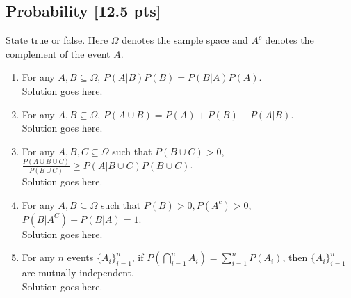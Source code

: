\documentclass[a4paper]{article}
\theoremstyle{definition}
\newenvironment{soln}{
    \leavevmode\color{blue}\ignorespaces
}{}
\begin{document}
\subsection{Probability [12.5 pts]}
State true or false. Here $\Omega$ denotes the sample space and $A^c$ denotes the complement of the event $A$.
\begin{enumerate}
\item For any $A, B \subseteq \Omega$, $P(A|B)P(B) = P(B|A)P(A)$.\\
  \begin{soln}  Solution goes here. \end{soln}
\item For any $A, B \subseteq \Omega$, $P(A \cup B) = P(A) + P(B) - P(A | B)$.\\         
  \begin{soln}  Solution goes here. \end{soln}
\item For any $A, B, C \subseteq \Omega$ such that $P(B \cup C) > 0$,
  $\frac{P(A \cup B \cup C)}{P(B \cup C)} \geq P(A | B \cup C) P(B \cup C)$.\\ \begin{soln}  Solution goes here. \end{soln}
\item For any $A, B\subseteq\Omega$ such that $P(B) > 0, P(A^c) > 0$,
  $P(B|A^C) + P(B|A) = 1$.\\ 
  \begin{soln}  Solution goes here. \end{soln}
\item For any $n$ events $\{A_i\}_{i=1}^n$, if
  $P(\bigcap_{i=1}^n A_i) = \sum_{i=1}^n P(A_i)$, then
  $\{A_i\}_{i=1}^n$ are mutually independent.\\
  \begin{soln}  Solution goes here. \end{soln}
\end{enumerate}
\end{document}
